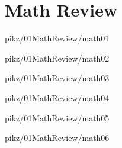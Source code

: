 \documentclass[9pt,xcolor={svgnames, x11names}]{beamer}
\begin{document}
\section{Math Review}

%   

\begin{frame}{pikz/01MathReview/math01}
  \resizebox{0.75\textwidth}{!}{%
    
  }
\end{frame}


\begin{frame}{pikz/01MathReview/math02}
  \resizebox{0.75\textwidth}{!}{%
    
  }
\end{frame}

\begin{frame}{pikz/01MathReview/math03}  
   
\end{frame}

\begin{frame}{pikz/01MathReview/math04}
  \resizebox{0.5\textwidth}{!}{%
    
  }
\end{frame}

\begin{frame}{pikz/01MathReview/math05}
  
\end{frame}

\begin{frame}{pikz/01MathReview/math06}
  
\end{frame}
\end{document}
